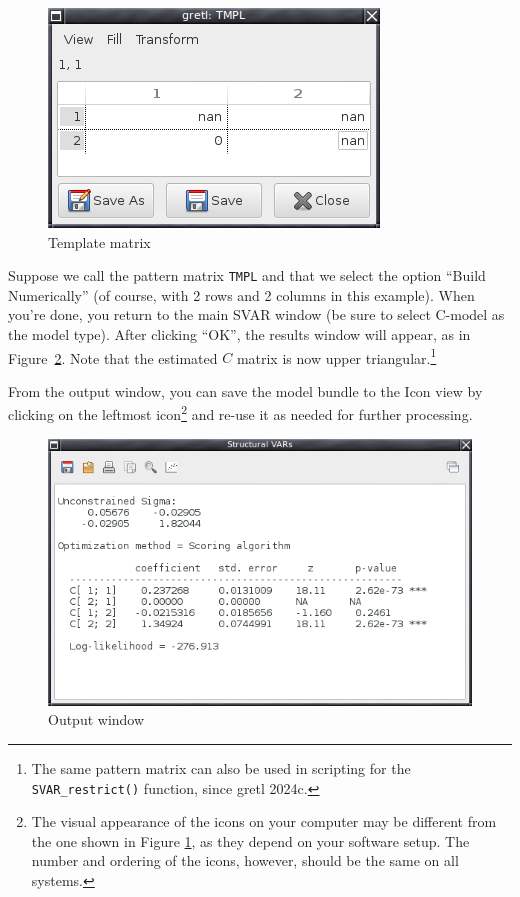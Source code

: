 \documentclass[a4paper,10pt]{article}
\newcounter{script}[section]
\begin{document}
\begin{figure}[htbp]
  \centering
  \includegraphics[scale=0.5]{TMPL.png}
  \caption{Template matrix}
  \label{fig:tmpl}
\end{figure}

Suppose we call the pattern matrix \texttt{TMPL} and that we select
the option ``Build Numerically'' (of course, with 2 rows and 2 columns
in this example).  When you're done, you return to the main SVAR
window (be sure to select C-model as the model type). After clicking
``OK'', the results window will appear, as in
Figure~\ref{fig:GUI-output}. Note that the estimated $C$ matrix is now
upper triangular.\footnote{The same pattern matrix can also be used 
in scripting for the \texttt{SVAR\_restrict()} function, since gretl 2024c.}

From the output window, you can save the model bundle to the Icon view
by clicking on the leftmost icon\footnote{The visual appearance of the
  icons on your computer may be different from the one shown in Figure
  \ref{fig:tmpl}, as they depend on your software setup.  The number
  and ordering of the icons, however, should be the same on all
  systems.} and re-use it as needed for further processing.
\begin{figure}[htbp]
  \centering
  \includegraphics[scale=0.5]{Output.png}
  \caption{Output window}
  \label{fig:GUI-output}
\end{figure}
\end{document}
